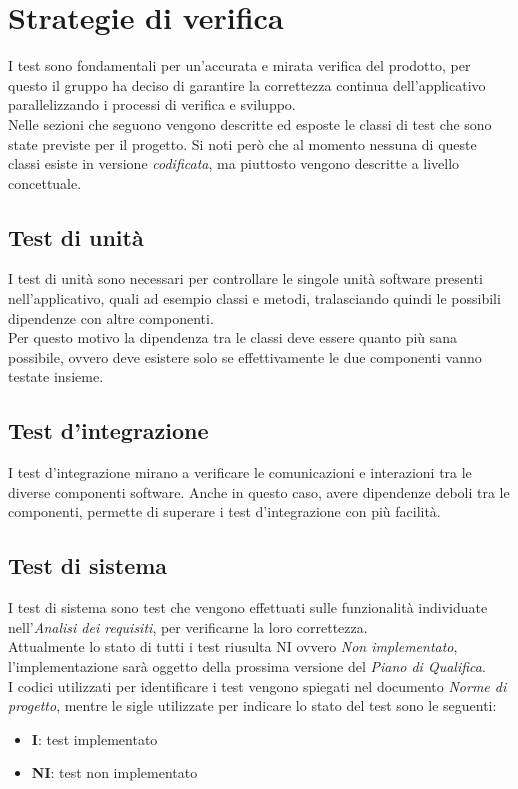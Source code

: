 \section{Strategie di verifica}
I test sono fondamentali per un'accurata e mirata verifica del prodotto, per questo il gruppo ha deciso di garantire la correttezza continua dell'applicativo parallelizzando i processi di verifica e sviluppo.\\
Nelle sezioni che seguono vengono descritte ed esposte le classi di test che sono state previste per il progetto. Si noti però che al momento nessuna di queste classi esiste in versione \textit{codificata}, ma piuttosto vengono descritte a livello concettuale.

\subsection{Test di unità}
I test di unità sono necessari per controllare le singole unità software presenti nell'applicativo, quali ad esempio classi e metodi, tralasciando quindi le possibili dipendenze con altre componenti.\\
Per questo motivo la dipendenza tra le classi deve essere quanto più sana possibile, ovvero deve esistere solo se effettivamente le due componenti vanno testate insieme.

\subsection{Test d'integrazione}
I test d'integrazione mirano a verificare le comunicazioni e interazioni tra le diverse componenti software. Anche in questo caso, avere dipendenze deboli tra le componenti, permette di superare i test d'integrazione con più facilità.

\subsection{Test di sistema}
I test di sistema sono test che vengono effettuati sulle funzionalità individuate nell'\textit{Analisi dei requisiti}, per verificarne la loro correttezza. \\
Attualmente lo stato di tutti i test riusulta NI ovvero \textit{Non implementato}, l'implementazione sarà oggetto della prossima versione del \textit{Piano di Qualifica}.\\
I codici utilizzati per identificare i test vengono spiegati nel documento \textit{Norme di progetto}, mentre le sigle utilizzate per indicare lo stato del test sono le seguenti: 
\begin{itemize}
    \item \textbf{I}: test implementato
    \item \textbf{NI}: test non implementato
\end{itemize}

